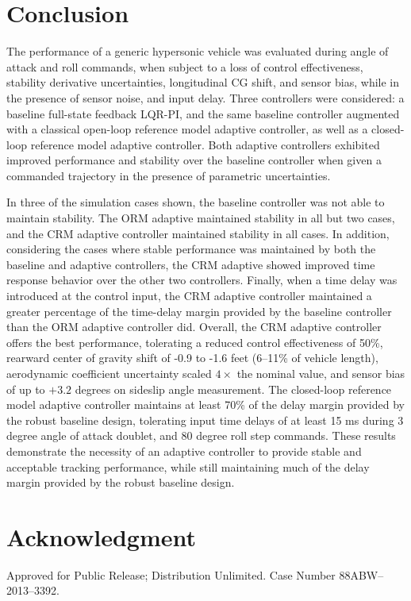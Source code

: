 \documentclass[]{../sty/aiaa-tc}
\newcommand{\bibsourcepath}{../bib/aiaa-gnc-2013}
\begin{document}
  \section{Conclusion}

  The performance of a generic hypersonic vehicle was evaluated during angle of attack and roll commands, when subject to a loss of control effectiveness, stability derivative uncertainties, longitudinal CG shift, and sensor bias, while in the presence of sensor noise, and input delay.
  Three controllers were considered: a baseline full-state feedback LQR-PI, and the same baseline controller augmented with a classical open-loop reference model adaptive controller, as well as a closed-loop reference model adaptive controller.
  Both adaptive controllers exhibited improved performance and stability over the baseline controller when given a commanded trajectory in the presence of parametric uncertainties.

  In three of the simulation cases shown, the baseline controller was not able to maintain stability.
  The ORM adaptive maintained stability in all but two cases, and the CRM adaptive controller maintained stability in all cases.
  In addition, considering the cases where stable performance was maintained by both the baseline and adaptive controllers, the CRM adaptive showed improved time response behavior over the other two controllers.
  Finally, when a time delay was introduced at the control input, the CRM adaptive controller maintained a greater percentage of the time-delay margin provided by the baseline controller than the ORM adaptive controller did.
  Overall, the CRM adaptive controller offers the best performance, tolerating a reduced control effectiveness of 50\%, rearward center of gravity shift of -0.9 to -1.6 feet (6--11\% of vehicle length), aerodynamic coefficient uncertainty scaled $4\times$ the nominal value, and sensor bias of up to $+3.2$ degrees on sideslip angle measurement.
  The closed-loop reference model adaptive controller maintains at least 70\% of the delay margin provided by the robust baseline design, tolerating input time delays of at least 15 ms during 3 degree angle of attack doublet, and 80 degree roll step commands.
  These results demonstrate the necessity of an adaptive controller to provide stable and acceptable tracking performance, while still maintaining much of the delay margin provided by the robust baseline design.

  \section{Acknowledgment}

  Approved for Public Release; Distribution Unlimited.
  Case Number 88ABW--2013--3392.

  
  
\end{document}

